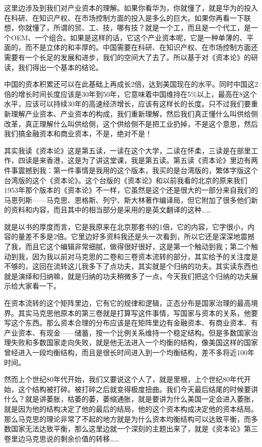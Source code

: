 \documentclass[UTF8, 12pt, a4paper]{ctexrep}
\begin{document}
这里边涉及到我们对产业资本的理解。如果你看华为，你就懂了，就是华为的投入在科研、在知识产权、在市场控制方面的投入是多么的巨大。如果你再看一下联想，你就懂了，所谓的贸、工、技，哪有技？就是一个工，而且是一个代工，是一个OEM、一个组合。如果是这样的话，它这个产业资本呢，它是一种单薄的、平面的，而不是立体的和丰厚的。中国需要在科研、在知识产权、在市场控制方面还需要有一个长足的发展和进步，我们的空间大了去了。所以基于对《资本论》的研读，我们得出一个基本的结论。

中国的资本积累还可以在此基础上再成长2倍，达到美国现在的水平。同时中国这2倍的增长时间长度应该是30年到50年，它意味着中国维持在5\%以上，最高在8这个水平，应该可以持续30年的高速经济增长，应该有这样长的长度。只不过我们要重新理解产业资本、产业资本的构成，我们重新理解，然后我们真正懂什么叫供给侧改革，真正理解什么叫供给侧，这个供给侧不是把工业扔掉，不是这个意思，然后我们搞金融资本和商业资本，不是，绝对不是！

其实我读《资本论》这是第五读，一读在这个大学，二读在怀柔，三读是在部里工作，四读是来香港，这是为了讲这堂课，我是第五读。第五读《资本论》里边有两件事震撼到我：第一件事情是我用的这个版本，我买的是台湾版的，繁体字版这个台湾版的这个《资本论》。这个台版的《资本论》和以前我看的北京的原来我们1953年那个版本的《资本论》不一样，它虽然是这个还是很大的一部分来自我们的马恩列斯——马克思、恩格斯、列宁、斯大林著作编译局，但它附加了很多他们新的资料和内容，而且其中的相当部分是采用的是英文翻译的这种……

就是以书的厚度而言，它是我原来在北京那套书的1倍，它的内容，它字很小，内容的量差不多是2倍。它里边好多资料我还是头一次看到，所以它还是深深地震撼了我，而且它这个编辑非常细腻，做得很好很好，这是第一个触动到我；第二个触动到我，因为我以前对马克思的二卷和三卷资本流转的部分，其实给予的关注度是不够的，这回在流转这儿我多下了点功夫，其实就是个归纳的功夫。其实读东西也就是演绎和归纳嘛，就是归纳的功夫稍微多了一点，今天我们把这个归纳的功夫展示给大家看一下。

在资本流转的这个矩阵里边，它有它的规律和逻辑，正态分布是国家治理的最高境界。其实马克思他原本的第三卷就是打算写这件事情，写国家与资本的关系，他要写这个东西。那么资本合理的分布应该是在矩阵里边有金融资本、有商业资本、有产业资本、有现金——储蓄，按一个比例关系维持一个稳定结构。但是多数国家治理失败和多数国家走向失败，就是他无法进入一个均衡的结构，像美国这样的国家曾经进入一段均衡结构，而且是很长时间进入到一个均衡结构，差不多将近100年时间。

然而上个世纪80年代开始，我们又要说这个人了，就是里根，上个世纪80年代开始，这个结构被打碎。被打碎之后就变得极度扭曲。我们今天最后结尾的时候要讲什么？就是讲萎胀，枯萎的萎，萎缩通胀，就是要讲为什么美国一定会进入萎胀，就是因为他的结构决定了他的最后的结局，他的这个资本构成决定他的资本结局。那么马克思的理论非常了不起的地方就是为什么资本均衡结构可以达致平衡，而多数国家无法达致平衡，那么这里边就一个深刻的主题出来了，就是《资本论》第三卷里边马克思说的剩余价值的转移……
\end{document}
